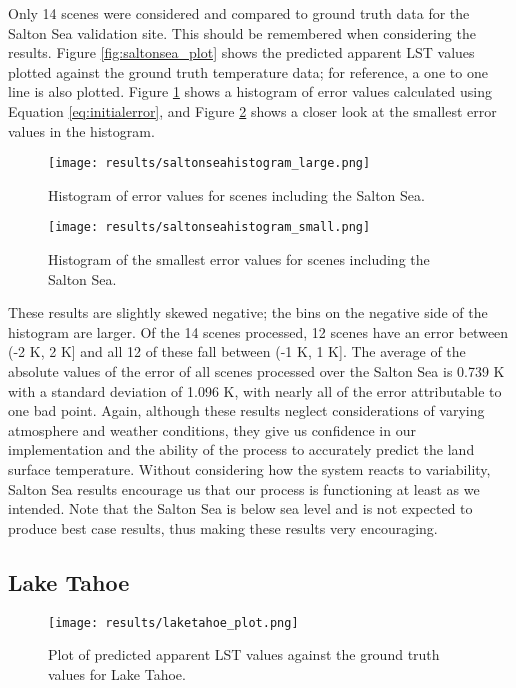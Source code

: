 \documentclass{book}
\begin{document}
Only 14 scenes were considered and compared to ground truth data for the Salton Sea validation site.  This should be remembered when considering the results.  Figure \ref{fig:saltonsea_plot} shows the predicted apparent LST values plotted against the ground truth temperature data; for reference, a one to one line is also plotted.  Figure \ref{fig:saltonseahistogram_large} shows a histogram of error values calculated using Equation \ref{eq:initialerror}, and Figure \ref{fig:saltonseahistogram_small} shows a closer look at the smallest error values in the histogram.

\begin{figure}[H]
\centering
\texttt{[image: results/saltonseahistogram\_large.png]}
\caption{Histogram of error values for scenes including the Salton Sea.}
\label{fig:saltonseahistogram_large}
\end{figure}

\begin{figure}[H]
\centering
\texttt{[image: results/saltonseahistogram\_small.png]}
\caption{Histogram of the smallest error values for scenes including the Salton Sea.}
\label{fig:saltonseahistogram_small}
\end{figure}

These results are slightly skewed negative; the bins on the negative side of the histogram are larger.  Of the 14 scenes processed, 12 scenes have an error between (-2 K, 2 K] and all 12 of these fall between (-1 K, 1 K].  The average of the absolute values of the error of all scenes processed over the Salton Sea is 0.739 K with a standard deviation of 1.096 K, with nearly all of the error attributable to one bad point.  Again, although these results neglect considerations of varying atmosphere and weather conditions, they give us confidence in our implementation and the ability of the process to accurately predict the land surface temperature.  Without considering how the system reacts to variability, Salton Sea results encourage us that our process is functioning at least as we intended.  Note that the Salton Sea is below sea level and is not expected to produce best case results, thus making these results very encouraging.

\subsection{Lake Tahoe}
\label{sec:laketahoeresults}

\begin{figure}[H]
\centering
\texttt{[image: results/laketahoe\_plot.png]}
\caption{Plot of predicted apparent LST values against the ground truth values for Lake Tahoe.}
\label{fig:laketahoe_plot}
\end{figure}
\end{document}
